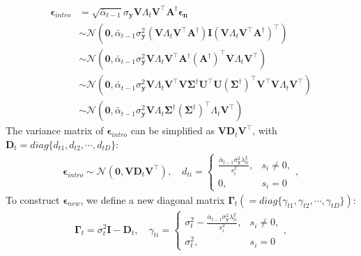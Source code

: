 \documentclass{article} \usepackage{iclr2023_conference,times}
\begin{document}
\begin{align}
    \boldsymbol{\epsilon}_{intro} &= \sqrt{\bar{\alpha}_{t-1}}\sigma_{\mathbf{y}}\mathbf{V}\Lambda_{t}\mathbf{V}^{\top}\mathbf{A}^{\dagger}\boldsymbol{\epsilon}_{\mathbf{n}}\\
    &\sim\mathcal{N}(\mathbf{0}, \bar{\alpha}_{t-1}\sigma_{\mathbf{y}}^2(\mathbf{V}\Lambda_{t}\mathbf{V}^{\top}\mathbf{A}^{\dagger})\mathbf{I}(\mathbf{V}\Lambda_{t}\mathbf{V}^{\top}\mathbf{A}^{\dagger})^{\top})\\
    &\sim\mathcal{N}(\mathbf{0}, \bar{\alpha}_{t-1}\sigma_{\mathbf{y}}^2\mathbf{V}\Lambda_{t}\mathbf{V}^{\top}\mathbf{A}^{\dagger}(\mathbf{A}^{\dagger})^{\top}\mathbf{V}\Lambda_{t}\mathbf{V}^{\top})\\
    &\sim\mathcal{N}(\mathbf{0}, \bar{\alpha}_{t-1}\sigma_{\mathbf{y}}^2\mathbf{V}\Lambda_{t}\mathbf{V}^{\top}\mathbf{V}\mathbf{\Sigma}^{\dagger}\mathbf{U}^{\top}\mathbf{U}(\mathbf{\Sigma}^{\dagger})^{\top}\mathbf{V}^{\top}\mathbf{V}\Lambda_{t}\mathbf{V}^{\top})\\
    &\sim\mathcal{N}(\mathbf{0}, \bar{\alpha}_{t-1}\sigma_{\mathbf{y}}^2\mathbf{V}\Lambda_{t}\mathbf{\Sigma}^{\dagger}(\mathbf{\Sigma}^{\dagger})^{\top}\Lambda_{t}\mathbf{V}^{\top})
\end{align}
The variance matrix of $\boldsymbol{\epsilon}_{intro}$ can be simplified as $\mathbf{V}\mathbf{D}_t\mathbf{V}^{\top}$, with $\mathbf{D}_t=diag\{d_{t1}, d_{t2}, \cdots, d_{tD}\}$: 
\begin{align}
    \boldsymbol{\epsilon}_{intro}\sim\mathcal{N}(\mathbf{0}, \mathbf{V}\mathbf{D}_t\mathbf{V}^{\top}),\quad
    d_{ti}=\begin{cases}
    \frac{\bar{\alpha}_{t-1}\sigma_{\mathbf{y}}^2\lambda_{ti}^2}{s_i^2}, & s_i \neq 0 , \\
        0, & s_i = 0
    \end{cases},
\end{align}
To construct $\boldsymbol{\epsilon}_{new}$, we define a new diagonal matrix $\mathbf{\Gamma}_t(=diag\{\gamma_{t1}, \gamma_{t2}, \cdots, \gamma_{tD}\})$:
\begin{align}
  \mathbf{\Gamma}_t=\sigma_{t}^2\mathbf{I}-\mathbf{D}_t,\quad
    \gamma_{ti}=\begin{cases}
        \sigma_t^2 - \frac{\bar{\alpha}_{t-1}\sigma_{\mathbf{y}}^2\lambda_{ti}^2}{s_i^2}, & s_i \neq 0 , \\
        \sigma_t^2, & s_i = 0
    \end{cases},
    \label{eq:gamma_ddim}
\end{align}
\end{document}
